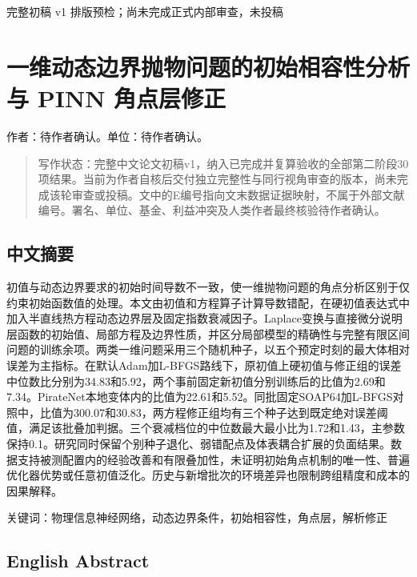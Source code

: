 \documentclass[11pt,a4paper]{article}
\begin{document}
\noindent\small\textsf{完整初稿 v1 排版预检；尚未完成正式内部审查，未投稿}\normalsize\par\medskip
\section{一维动态边界抛物问题的初始相容性分析与 PINN 角点层修正}\label{ux4e00ux7ef4ux52a8ux6001ux8fb9ux754cux629bux7269ux95eeux9898ux7684ux521dux59cbux76f8ux5bb9ux6027ux5206ux6790ux4e0e-pinn-ux89d2ux70b9ux5c42ux4feeux6b63}

作者：待作者确认。单位：待作者确认。

\begin{quote}
写作状态：完整中文论文初稿v1，纳入已完成并复算验收的全部第二阶段30项结果。当前为作者自核后交付独立完整性与同行视角审查的版本，尚未完成该轮审查或投稿。文中的E编号指向文末数据证据映射，不属于外部文献编号。署名、单位、基金、利益冲突及人类作者最终核验待作者确认。
\end{quote}

\subsection{中文摘要}\label{ux4e2dux6587ux6458ux8981}

初值与动态边界要求的初始时间导数不一致，使一维抛物问题的角点分析区别于仅约束初始函数值的处理。本文由初值和方程算子计算导数错配，在硬初值表达式中加入半直线热方程动态边界层及固定指数衰减因子。Laplace变换与直接微分说明层函数的初始值、局部方程及边界性质，并区分局部模型的精确性与完整有限区间问题的训练余项。两类一维问题采用三个随机种子，以五个预定时刻的最大体相对误差为主指标。在默认Adam加L-BFGS路线下，原初值上硬初值与修正组的误差中位数比分别为34.83和5.92，两个事前固定新初值分别训练后的比值为2.69和7.34。PirateNet本地变体内的比值为22.61和5.52。同批固定SOAP64加L-BFGS对照中，比值为300.07和30.83，两方程修正组均有三个种子达到既定绝对误差阈值，满足该批叠加判据。三个衰减档位的中位数最大最小比为1.72和1.43，主参数保持0.1。研究同时保留个别种子退化、弱错配点及体表耦合扩展的负面结果。数据支持被测配置内的经验改善和有限叠加性，未证明初始角点机制的唯一性、普遍优化器优势或任意初值泛化。历史与新增批次的环境差异也限制跨组精度和成本的因果解释。

关键词：物理信息神经网络，动态边界条件，初始相容性，角点层，解析修正

\subsection{English Abstract}\label{english-abstract}
\end{document}
